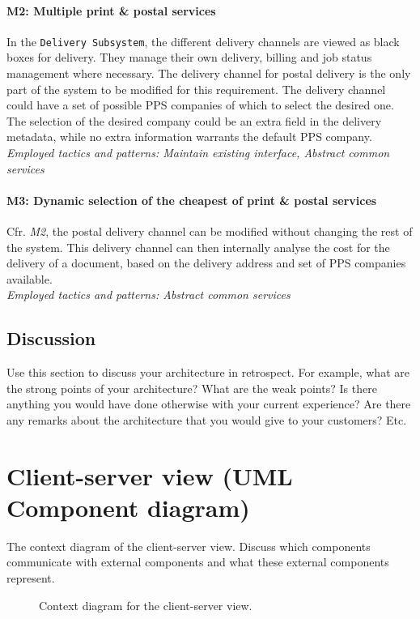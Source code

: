 \documentclass[a4paper,10pt]{article}
\begin{document}
\paragraph{M2\@: Multiple print \& postal services} 
In the \texttt{Delivery Subsystem}, the different delivery channels are viewed as black boxes for delivery. They manage their own delivery, billing and job status management where necessary. The delivery channel for postal delivery is the only part of the system to be modified for this requirement. The delivery channel could have a set of possible PPS companies of which to select the desired one. The selection of the desired company could be an extra field in the delivery metadata, while no extra information warrants the default PPS company.\\
\emph{Employed tactics and patterns: Maintain existing interface, Abstract common services}
    
\paragraph{M3\@: Dynamic selection of the cheapest of print \& postal services}
Cfr. \emph{M2}, the postal delivery channel can be modified without changing the rest of the system. This delivery channel can then internally analyse the cost for the delivery of a document, based on the delivery address and set of PPS companies available.\\
\emph{Employed tactics and patterns: Abstract common services}

\subsection{Discussion}
Use this section to discuss your architecture in retrospect.
For example, what are the strong points of your architecture?
What are the weak points? Is there anything you would have done otherwise with
your current experience?
Are there any remarks about the architecture that you would give to your
customers?
Etc.

\section{Client-server view (UML Component diagram)}\label{sec:client-server}
The context diagram of the client-server view.
Discuss which components communicate with external components and what these
external components represent.

\begin{figure}[!htp]
    \centering
    \caption{Context diagram for the client-server view.
        }\label{fig:cc-context}
\end{figure}
\end{document}
